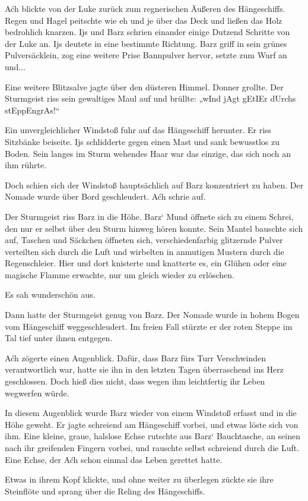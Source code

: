 Aćh blickte von der Luke zurück zum regnerischen Äußeren des Hängeschiffs. Regen und Hagel peitschte wie eh und je über das Deck und ließen das Holz bedrohlich knarzen. Ijs und Barz schrien einander einige Dutzend Schritte von der Luke an. Ijs deutete in eine bestimmte Richtung. Barz griff in sein grünes Pulversäcklein, zog eine weitere Prise Bannpulver hervor, setzte zum Wurf an und...

Eine weitere Blitzsalve jagte über den düsteren Himmel. Donner grollte. Der Sturmgeist riss sein gewaltiges Maul auf und brüllte: „wInd jAgt gEtIEr dUrchs stEppEngrAs!“

Ein unvergleichlicher Windstoß fuhr auf das Hängeschiff herunter. Er riss Sitzbänke beiseite. Ijs schlidderte gegen einen Mast und sank bewusstlos zu Boden. Sein langes im Sturm wehendes Haar war das einzige, das sich noch an ihm rührte.

Doch schien sich der Windstoß hauptsächlich auf Barz konzentriert zu haben. Der Nomade wurde über Bord geschleudert. Aćh schrie auf.

Der Sturmgeist riss Barz in die Höhe. Barz‘ Mund öffnete sich zu einem Schrei, den nur er selbst über den Sturm hinweg hören konnte. Sein Mantel bauschte sich auf, Taschen und Säckchen öffneten sich, verschiedenfarbig glitzernde Pulver verteilten sich durch die Luft und wirbelten in anmutigen Mustern durch die Regenschleier. Hier und dort knisterte und knatterte es, ein Glühen oder eine magische Flamme erwachte, nur um gleich wieder zu erlöschen.

Es sah wunderschön aus.

Dann hatte der Sturmgeist genug von Barz. Der Nomade wurde in hohem Bogen vom Hängeschiff weggeschleudert. Im freien Fall stürzte er der roten Steppe im Tal tief unter ihnen entgegen.

Aćh zögerte einen Augenblick. Dafür, dass Barz fürs Turr Verschwinden verantwortlich war, hatte sie ihn in den letzten Tagen überraschend ins Herz geschlossen. Doch hieß dies nicht, dass wegen ihm leichtfertig ihr Leben wegwerfen würde.

In diesem Augenblick wurde Barz wieder von einem Windstoß erfasst und in die Höhe geweht. Er jagte schreiend am Hängeschiff vorbei, und etwas löste sich von ihm. Eine kleine, graue, halslose Echse rutschte aus Barz‘ Bauchtasche, an seinen nach ihr greifenden Fingern vorbei, und rauschte selbst schreiend durch die Luft. Eine Echse, der Aćh schon einmal das Leben gerettet hatte.

Etwas in ihrem Kopf klickte, und ohne weiter zu überlegen zückte sie ihre Steinflöte und sprang über die Reling des Hängeschiffs.

